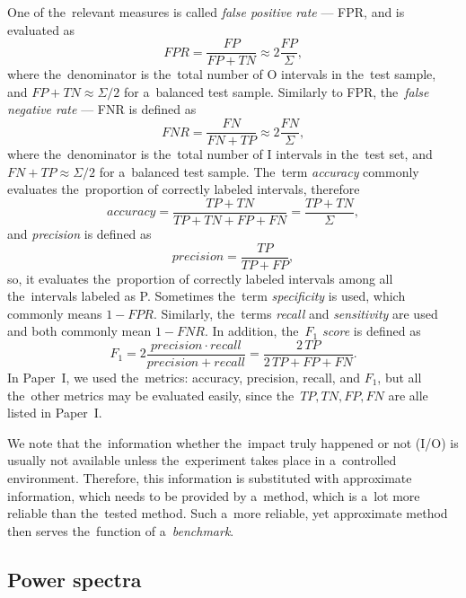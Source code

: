 One of the~relevant measures is called \textit{false positive rate} --- FPR, and is evaluated as 
\begin{equation}
    FPR = \frac{FP}{FP+TN} \approx 2 \frac{FP}{\Sigma},
\end{equation}
where the~denominator is the~total number of O intervals in the~test sample, and $FP+TN \approx \Sigma/2$ for a~balanced test sample. Similarly to FPR, the~\textit{false negative rate} --- FNR is defined as
\begin{equation}
    FNR = \frac{FN}{FN+TP} \approx 2 \frac{FN}{\Sigma},
\end{equation}
where the~denominator is the~total number of I intervals in the~test set, and $FN+TP \approx \Sigma/2$ for a~balanced test sample. The~term \textit{accuracy} commonly evaluates the~proportion of correctly labeled intervals, therefore
\begin{equation}
    accuracy = \frac{TP + TN}{TP + TN + FP + FN} = \frac{TP + TN}{\Sigma},
\end{equation}
and \textit{precision} is defined as
\begin{equation}
    precision = \frac{TP}{TP + FP},
\end{equation}
so, it evaluates the~proportion of correctly labeled intervals among all the~intervals labeled as P. Sometimes the~term \textit{specificity} is used, which commonly means $1-FPR$. Similarly, the~terms \textit{recall} and \textit{sensitivity} are used and both commonly mean $1-FNR$. In addition, the~$F_1$ \textit{score} is defined as
\begin{equation}
    F_1 = 2\frac{precision \cdot recall}{precision + recall} = \frac{2 \, TP}{2 \, TP + FP + FN}.
\end{equation}
In Paper~I, we used the~metrics: accuracy, precision, recall, and $F_1$, but all the~other metrics may be evaluated easily, since the~$TP, TN, FP, FN$ are alle listed in Paper~I. 

We note that the~information whether the~impact truly happened or not (I/O) is usually not available unless the~experiment takes place in a~controlled environment. Therefore, this information is substituted with approximate information, which needs to be provided by a~method, which is a~lot more reliable than the~tested method. Such a~more reliable, yet approximate method then serves the~function of a~\textit{benchmark}.

\subsection{Power spectra}

